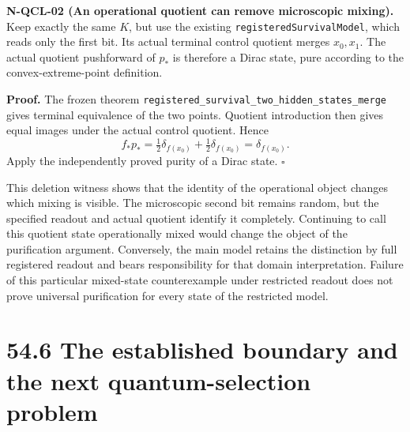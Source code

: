 \documentclass[
  11pt,
  oneside]{book}
\begin{document}
\label{n-qcl-02}{}

\textbf{N-QCL-02 (An operational quotient can remove microscopic
mixing).} Keep exactly the same \(K\), but use the existing
\texttt{registered\allowbreak Survival\allowbreak Model}, which reads only the first bit. Its
actual terminal control quotient merges \(x_0,x_1\). The actual quotient
pushforward of \(p_*\) is therefore a Dirac state, pure according to the
convex-extreme-point definition.

\textbf{Proof.} The frozen theorem
\texttt{registered\_\allowbreak survival\_\allowbreak two\_\allowbreak hidden\_\allowbreak states\_\allowbreak merge} gives terminal
equivalence of the two points. Quotient introduction then gives equal
images under the actual control quotient. Hence \[
f_*p_* = \tfrac12\delta_{f(x_0)}+\tfrac12\delta_{f(x_0)}
=\delta_{f(x_0)}.
\] Apply the independently proved purity of a Dirac state. \(\square\)

This deletion witness shows that the identity of the operational object
changes which mixing is visible. The microscopic second bit remains
random, but the specified readout and actual quotient identify it
completely. Continuing to call this quotient state operationally mixed
would change the object of the purification argument. Conversely, the
main model retains the distinction by full registered readout and bears
responsibility for that domain interpretation. Failure of this
particular mixed-state counterexample under restricted readout does not
prove universal purification for every state of the restricted model.

\section{54.6 The established boundary and the next quantum-selection
problem}
\end{document}
